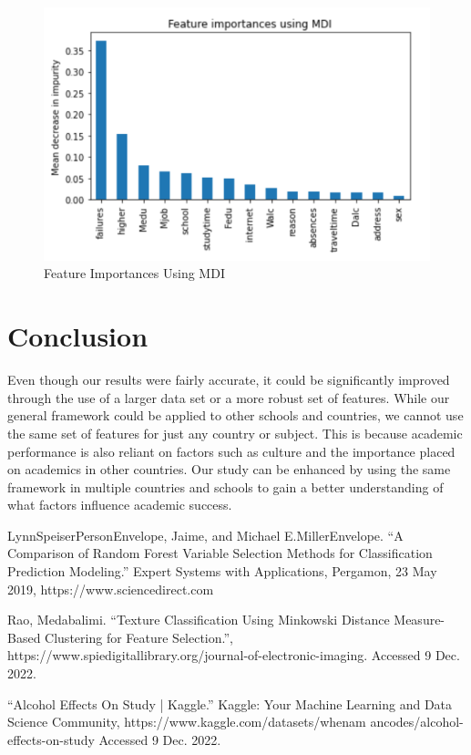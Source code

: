 \documentclass[twoside,twocolumn]{article}
\begin{document}
\begin{figure}
  \includegraphics[width=\linewidth]{importance.png}
  \caption{Feature Importances Using MDI}
  \label{fig:imp}
\end{figure}

\section{Conclusion}
Even though our results were fairly accurate, it could be significantly improved through the use of a larger data set or a more robust set of features. While our general framework could be applied to other schools and countries, we cannot use the same set of features for just any country or subject. This is because academic performance is also reliant on factors such as culture and the importance placed on academics in other countries. Our study can be enhanced by using the same framework in multiple countries and schools to gain a better understanding of what factors influence academic success.


\begin{thebibliography}{99} %
\bibitem{}LynnSpeiserPersonEnvelope, Jaime, and Michael E.MillerEnvelope. “A Comparison of Random Forest Variable Selection Methods for Classification Prediction Modeling.” Expert Systems with Applications, Pergamon, 23 May 2019, https://www.sciencedirect.com

\bibitem{}Rao, Medabalimi. “Texture Classification Using Minkowski Distance Measure-Based Clustering for Feature Selection.”, https://www.spiedigitallibrary.org/journal-of-electronic-imaging. Accessed 9 Dec. 2022.

\bibitem{}“Alcohol Effects On Study | Kaggle.” Kaggle: Your Machine Learning and Data Science Community, https://www.kaggle.com/datasets/whenam ancodes/alcohol-effects-on-study Accessed 9 Dec. 2022.
\end{thebibliography}
\end{document}
